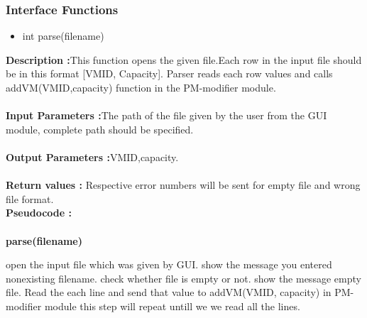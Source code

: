 \documentclass[a4paper,11pt]{article}
\begin{document}
\subsubsection{Interface Functions}
\begin{itemize}
\item int parse(filename)
\end{itemize}
\textbf{Description :}This function opens the given file.Each row in the input file should be in this format [VM\textunderscore ID, Capacity]. Parser reads each row values and calls addVM(VM\textunderscore ID,capacity) function in the PM-modifier module.\\
\\
\textbf{Input Parameters :}The path of the file given by the user from the GUI module, complete path should be specified.\\
\\
\textbf{Output Parameters :}VM\textunderscore ID,capacity.\\
\\
\textbf{Return values :} Respective error numbers will be sent for empty file and wrong file format.
\pagebreak
\\
\textbf{Pseudocode :}\\
\\
\textbf{parse(filename)}
\begin{algorithmic}[1]
\STATE open the input file which was given by GUI. 
\STATE show the message you entered nonexisting filename.
\ENDIF
\STATE check whether file is empty or not.
\STATE show the message empty file.
\ELSE
\STATE Read the each line and send that value to addVM(VM\textunderscore ID, capacity) in PM-modifier module
\STATE this step will repeat untill we we read all the lines.
\ENDIF

\end{algorithmic}
\end{document}
